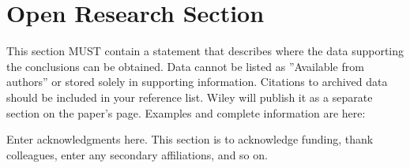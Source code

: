 \documentclass[draft]{agujournal2019}
\begin{document}
%
%

\section*{Open Research Section}
This section MUST contain a statement that describes where the data supporting the conclusions can be obtained. Data cannot be listed as ''Available from authors'' or stored solely in supporting information. Citations to archived data should be included in your reference list. Wiley will publish it as a separate section on the paper’s page. Examples and complete information are here:


\acknowledgments
Enter acknowledgments here. This section is to acknowledge funding, thank colleagues, enter any secondary affiliations, and so on.


%
 
%

%



%
%
%
%
%
\end{document}
